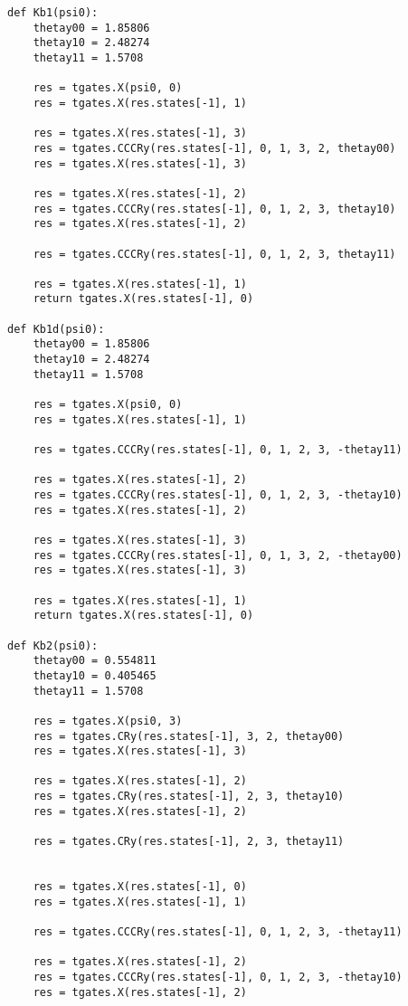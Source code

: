 \begin{verbatim}
def Kb1(psi0):
    thetay00 = 1.85806
    thetay10 = 2.48274
    thetay11 = 1.5708

    res = tgates.X(psi0, 0)
    res = tgates.X(res.states[-1], 1)

    res = tgates.X(res.states[-1], 3)
    res = tgates.CCCRy(res.states[-1], 0, 1, 3, 2, thetay00)
    res = tgates.X(res.states[-1], 3)

    res = tgates.X(res.states[-1], 2)
    res = tgates.CCCRy(res.states[-1], 0, 1, 2, 3, thetay10)
    res = tgates.X(res.states[-1], 2)

    res = tgates.CCCRy(res.states[-1], 0, 1, 2, 3, thetay11)

    res = tgates.X(res.states[-1], 1)
    return tgates.X(res.states[-1], 0)

def Kb1d(psi0):
    thetay00 = 1.85806
    thetay10 = 2.48274
    thetay11 = 1.5708

    res = tgates.X(psi0, 0)
    res = tgates.X(res.states[-1], 1)

    res = tgates.CCCRy(res.states[-1], 0, 1, 2, 3, -thetay11)

    res = tgates.X(res.states[-1], 2)
    res = tgates.CCCRy(res.states[-1], 0, 1, 2, 3, -thetay10)
    res = tgates.X(res.states[-1], 2)

    res = tgates.X(res.states[-1], 3)
    res = tgates.CCCRy(res.states[-1], 0, 1, 3, 2, -thetay00)
    res = tgates.X(res.states[-1], 3)

    res = tgates.X(res.states[-1], 1)
    return tgates.X(res.states[-1], 0)

def Kb2(psi0):
    thetay00 = 0.554811
    thetay10 = 0.405465
    thetay11 = 1.5708

    res = tgates.X(psi0, 3)
    res = tgates.CRy(res.states[-1], 3, 2, thetay00)
    res = tgates.X(res.states[-1], 3)

    res = tgates.X(res.states[-1], 2)
    res = tgates.CRy(res.states[-1], 2, 3, thetay10)
    res = tgates.X(res.states[-1], 2)

    res = tgates.CRy(res.states[-1], 2, 3, thetay11)


    res = tgates.X(res.states[-1], 0)
    res = tgates.X(res.states[-1], 1)

    res = tgates.CCCRy(res.states[-1], 0, 1, 2, 3, -thetay11)

    res = tgates.X(res.states[-1], 2)
    res = tgates.CCCRy(res.states[-1], 0, 1, 2, 3, -thetay10)
    res = tgates.X(res.states[-1], 2)


\end{verbatim}
